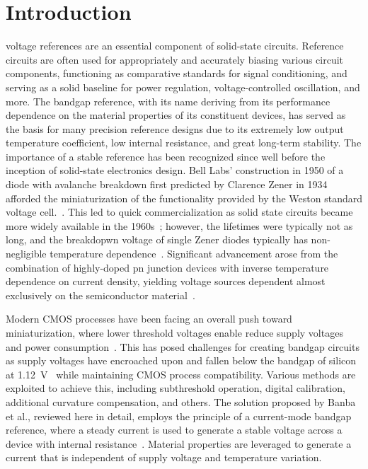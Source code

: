 \documentclass[journal]{IEEEtran}
\begin{document}
\section{Introduction}
% 
% 
% 
% 
 voltage references are an essential component of solid-state circuits. Reference circuits are often used for appropriately and accurately biasing various circuit components, functioning as comparative standards for signal conditioning, and serving as a solid baseline for power regulation, voltage-controlled oscillation, and more. The bandgap reference, with its name deriving from its performance dependence on the material properties of its constituent devices, has served as the basis for many precision reference designs due to its extremely low output temperature coefficient, low internal resistance, and great long-term stability. The importance of a stable reference has been recognized since well before the inception of solid-state electronics design. Bell Labs' construction in 1950 of a diode with avalanche breakdown first predicted by Clarence Zener in 1934 afforded the miniaturization of the functionality provided by the Weston standard voltage cell.~\cite{Weston1893,Zener1934}. This led to quick commercialization as solid state circuits became more widely available in the 1960s~\cite{Mullard1960}; however, the lifetimes were typically not as long, and the breakdopwn voltage of single Zener diodes typically has non-negligible temperature dependence~\cite{Baker1960}. Significant advancement arose from the combination of highly-doped pn junction devices with inverse temperature dependence on current density, yielding voltage sources dependent almost exclusively on the semiconductor material~\cite{Hibiber1964}.

Modern CMOS processes have been facing an overall push toward miniaturization, where lower threshold voltages enable reduce supply voltages and power consumption~\cite{Gonzalez1997}. This has posed challenges for creating bandgap circuits as supply voltages have encroached upon and fallen below the bandgap of silicon at \qty{1.12}{\V}~\cite{Hu2009} while maintaining CMOS process compatibility. Various methods are exploited to achieve this, including subthreshold operation, digital calibration, additional curvature compensation, and others. The solution proposed by Banba et al., reviewed here in detail, employs the principle of a current-mode bandgap reference, where a steady current is used to generate a stable voltage across a device with internal resistance~\cite{Banba1999}. Material properties are leveraged to generate a current that is independent of supply voltage and temperature variation.
\end{document}

